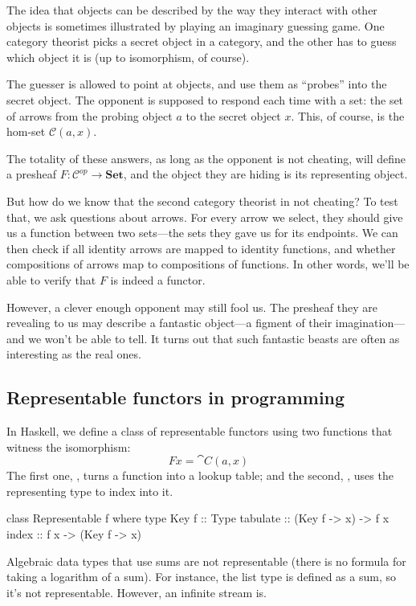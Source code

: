 \documentclass[DaoFP]{subfiles}
\begin{document}
The idea that objects can be described by the way they interact with other objects is sometimes illustrated by playing an imaginary guessing game. One category theorist picks a secret object in a category, and the other has to guess which object it is (up to isomorphism, of course). 

The guesser is allowed to point at objects, and use them as ``probes'' into the secret object. The opponent is supposed to respond each time with a set: the set of arrows from the probing object $a$ to the secret object $x$. This, of course, is the hom-set $\mathcal{C}(a, x)$. 

The totality of these answers, as long as the opponent is not cheating, will define a presheaf $F \colon \mathcal{C}^{op} \to \mathbf{Set}$, and the object they are hiding is its representing object. 

But how do we know that the second category theorist in not cheating? To test that, we ask questions about arrows. For every arrow we select, they should give us a function between two sets---the sets they gave us for its endpoints. We can then check if all identity arrows are mapped to identity functions, and whether compositions of arrows map to compositions of functions. In other words, we'll be able to verify that $F$ is indeed a functor. 

However, a clever enough opponent may still fool us. The presheaf they are revealing to us may describe a fantastic object---a figment of their imagination---and we won't be able to tell. It turns out that such fantastic beasts are often as interesting as the real ones. 

\subsection{Representable functors in programming}

In Haskell, we define a class of representable functors using two functions that witness the isomorphism: 
\[ F x = \cat C(a, x) \]
The first one, , turns a function into a lookup table; and the second, , uses the representing type  to index into it.

\begin{haskell}
class Representable f where
  type Key f :: Type
  tabulate :: (Key f -> x) -> f x
  index    :: f x -> (Key f -> x)
\end{haskell}

Algebraic data types that use sums are not representable (there is no formula for taking a logarithm of a sum). For instance, the list type is defined as a sum, so it's not representable. However, an infinite stream is. 
\end{document}
